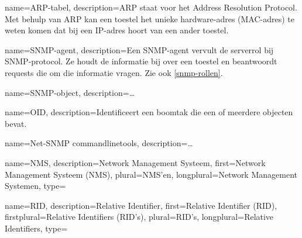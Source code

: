 
{
	name=ARP-tabel,
	description={ARP staat voor het Address Resolution Protocol.
				Met behulp van ARP kan een toestel het unieke hardware-adres (MAC-adres) te weten komen dat bij een IP-adres hoort van een ander toestel.\cite{arp-nlwiki}}
}

{
	name=SNMP-agent,
	description={Een SNMP-agent vervult de serverrol bij SNMP-protocol.
		Ze houdt de informatie bij over een toestel en beantwoordt requests die om die informatie vragen.
		Zie ook \cref{snmp-rollen}.}
}

{
	name=SNMP-object,
	description={\ldots}
}

{
	name=OID,
	description={Identificeert een boomtak die een of meerdere objecten bevat.}
}

{
	name={Net-SNMP commandlinetools},
	description={\ldots}
}






{
	name=NMS,
	description={Network Management Systeem},
	first={Network Management Systeem (NMS)},
	plural=NMS'en,
	longplural={Network Management Systemen},
	type=\acronymtype
}

{
	name=RID,
	description={Relative Identifier},
	first={Relative Identifier (RID)},
	firstplural={Relative Identifiers (RID's)},
	plural=RID's,
	longplural={Relative Identifiers},
	type=\acronymtype
}